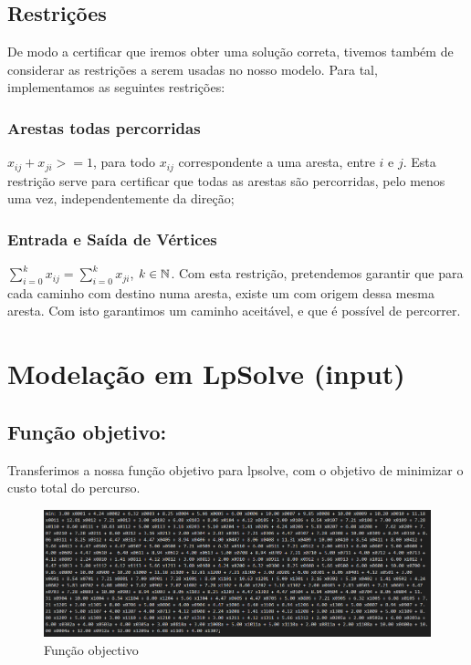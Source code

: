 \subsection{Restrições}

De modo a certificar que iremos obter uma solução correta, tivemos também de considerar as restrições a serem usadas no nosso modelo. Para tal, implementamos as seguintes restrições:

\subsubsection{Arestas todas percorridas}
$x_{ij} + x_{ji} >= 1$, para todo $x_{ij}$ correspondente a uma aresta, entre $i$ e $j$. Esta restrição serve para certificar que todas as arestas são percorridas, pelo menos uma vez, independentemente da direção;

\subsubsection{Entrada e Saída de Vértices}

$\sum_{i=0}^{k} x_{ij} = \sum_{i=0}^{k} x_{ji}$, $k\in \mathbb{N}$. Com esta restrição, pretendemos garantir que para cada caminho com destino numa aresta, existe um com origem dessa mesma aresta. Com isto garantimos um caminho aceitável, e que é possível de percorrer.

\section{Modelação em LpSolve (input)}

\subsection{Função objetivo:}
Transferimos a nossa função objetivo para lpsolve, com o objetivo de minimizar o custo total do percurso.
\begin{figure}[h!]
\centering
\includegraphics[width=1\textwidth]{images/main/FuncaoObjetivo.png}
\caption{Função objectivo}
\end{figure}


